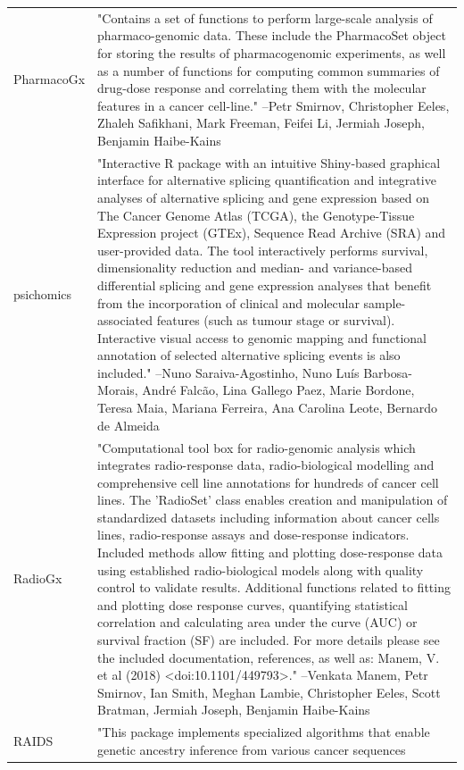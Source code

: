 \documentclass[]{article}
\begin{document}
\begin{longtable}[t]{l>{\raggedright\arraybackslash}p{25em}}
PharmacoGx & "Contains a set of functions to perform large-scale
analysis of pharmaco-genomic data. These include the
PharmacoSet object for storing the results of pharmacogenomic
experiments, as well as a number of functions for computing
common summaries of drug-dose response and correlating them
with the molecular features in a cancer cell-line." --Petr Smirnov, Christopher Eeles, Zhaleh Safikhani, Mark Freeman, Feifei Li, Jermiah Joseph, Benjamin Haibe-Kains\\
psichomics & "Interactive R package with an intuitive Shiny-based
graphical interface for alternative splicing quantification and
integrative analyses of alternative splicing and gene
expression based on The Cancer Genome Atlas (TCGA), the
Genotype-Tissue Expression project (GTEx), Sequence Read
Archive (SRA) and user-provided data. The tool interactively
performs survival, dimensionality reduction and median- and
variance-based differential splicing and gene expression
analyses that benefit from the incorporation of clinical and
molecular sample-associated features (such as tumour stage or
survival). Interactive visual access to genomic mapping and
functional annotation of selected alternative splicing events
is also included." --Nuno Saraiva-Agostinho, Nuno Luís Barbosa-Morais, André Falcão, Lina Gallego Paez, Marie Bordone, Teresa Maia, Mariana Ferreira, Ana Carolina Leote, Bernardo de Almeida\\
\addlinespace
RadioGx & "Computational tool box for radio-genomic analysis which
integrates radio-response data, radio-biological modelling and
comprehensive cell line annotations for hundreds of cancer cell
lines. The 'RadioSet' class enables creation and manipulation
of standardized datasets including information about cancer
cells lines, radio-response assays and dose-response
indicators. Included methods allow fitting and plotting
dose-response data using established radio-biological models
along with quality control to validate results. Additional
functions related to fitting and plotting dose response curves,
quantifying statistical correlation and calculating area under
the curve (AUC) or survival fraction (SF) are included. For
more details please see the included documentation, references,
as well as: Manem, V. et al (2018) <doi:10.1101/449793>." --Venkata Manem, Petr Smirnov, Ian Smith, Meghan Lambie, Christopher Eeles, Scott Bratman, Jermiah Joseph, Benjamin Haibe-Kains\\
RAIDS & "This package implements specialized algorithms that enable
genetic ancestry inference from various cancer sequences

\end{longtable}
\end{document}
